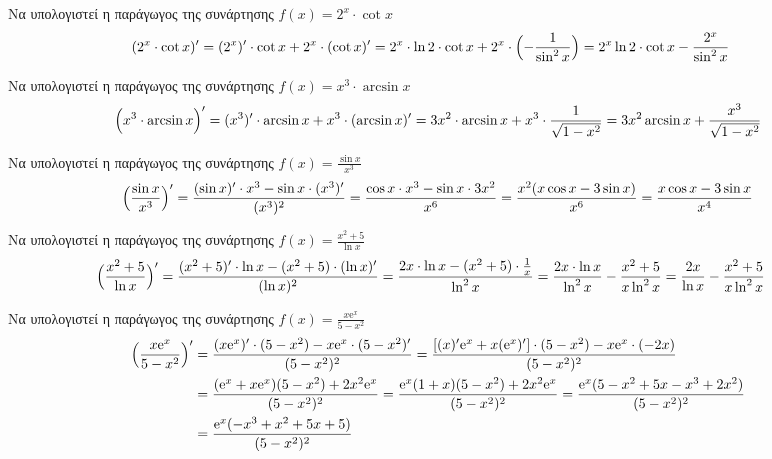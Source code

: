   \begin{exercise} Να υπολογιστεί η παράγωγος της συνάρτησης 
    $ f(x) = 2^{x} \cdot \cot{x} $
    \begin{align*}
      (2^{x}\cdot \cot{x})' 
      &= (2^{x})' \cdot \cot{x} + 2^{x} \cdot (\cot{x} )' =
      2^{x}\cdot \ln{2} \cdot \cot{x} + 2^{x}\cdot \Bigl(- \frac{1}{\sin^{2}{x}}\Bigr) = 
      2^{x} \ln{2} \cdot \cot{x} - \frac{2^{x}}{\sin^{2}{x}} 
    \end{align*}
  \end{exercise}

  \begin{exercise} Να υπολογιστεί η παράγωγος της συνάρτησης 
    $ f(x) = x^{3} \cdot \arcsin{x} $
    \[
      \Bigl(x^{3}\cdot \arcsin{x}\Bigr)' = (x^{3})' \cdot \arcsin{x} + x^{3} \cdot (\arcsin{x} )' = 
      3x^{2} \cdot \arcsin{x} + x^{3} \cdot \frac{1}{\sqrt{1-x^{2}}} = 3x^{2} \arcsin{x}
      + \frac{x^{3}}{\sqrt{1 - x^{2}}} 
    \]
  \end{exercise}

  \begin{exercise} Να υπολογιστεί η παράγωγος της συνάρτησης 
    $ f(x) = \frac{\sin{x}}{x^{3}} $
    \[
      \Bigl(\frac{\sin{x}}{x^{3}} \Bigr)' = \frac{(\sin{x} )' \cdot x^{3}- \sin{x} \cdot
      (x^{3})'}{(x^{3})^{2}} = \frac{\cos{x} \cdot x^{3}- \sin{x} \cdot 3x^{2}}{x^{6}} = 
      \frac{x^{2}(x \cos{x} - 3 \sin{x})}{x^{6}} = \frac{x \cos{x} - 3 \sin{x}}{x^{4}}
    \]  
  \end{exercise}

  \begin{exercise} Να υπολογιστεί η παράγωγος της συνάρτησης 
    $ f(x) = \frac{x^{2}+5}{\ln{x}} $
    \begin{align*}
      \Bigl(\frac{x^{2}+5}{\ln{x}} \Bigr)' 
    & = \frac{(x^{2}+5)'\cdot \ln{x} - (x^{2}+5)\cdot
      (\ln{x} )'}{(\ln{x} )^{2}} = \frac{2x \cdot \ln{x} - (x^{2}+5) \cdot
    \frac{1}{x}}{\ln^{2}{x}} = \frac{2x \cdot \ln{x}}{\ln^{2}{x}} - \frac{x^{2}+5}{x
  \ln^{2}{x}} = \frac{2x}{\ln{x}} - \frac{x^{2}+5}{x \ln^{2}{x}} 
    \end{align*}
  \end{exercise}

  \begin{exercise} Να υπολογιστεί η παράγωγος της συνάρτησης 
    $ f(x) = \frac{x \mathrm{e}^{x}}{5-x^{2}} $
    \begin{align*}
      \Bigl(\frac{x \mathrm{e}^{x}}{5-x^{2}} \Bigr)' 
    &= \frac{(x \mathrm{e}^{x} )'\cdot
    (5-x^{2})- x \mathrm{e}^{x} \cdot (5-x^{2})'}{(5-x^{2})^{2}} = \frac{[(x)'
    \mathrm{e}^{x} + x( \mathrm{e}^{x} )']\cdot (5-x^{2}) - x \mathrm{e}^{x}\cdot 
  (-2x)}{(5-x^{2})^{2}} \\ 
    &= \frac{(\mathrm{e}^{x} + x \mathrm{e}^{x})(5-x^{2})+2x^{2} 
    \mathrm{e}^{x}}{(5-x^{2})^{2}} 
    = \frac{\mathrm{e}^{x} (1+x)(5-x^{2})+2x^{2} \mathrm{e}^{x}}{(5-x^{2})^{2}} 
    = \frac{\mathrm{e}^{x} (5-x^{2}+5x-x^{3}+2x^{2})}{(5-x^{2})^{2}} \\
    &= \frac{\mathrm{e}^{x} (-x^{3}+x^{2}+5x+5)}{(5-x^{2})^{2}} 
    \end{align*}
  \end{exercise}



